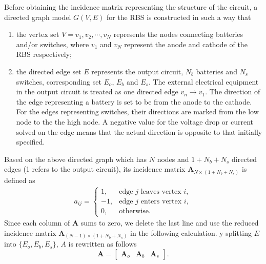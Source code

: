 \documentclass{article}
\begin{document}
Before obtaining the incidence matrix representing the structure of the circuit, a directed graph model $G(V,E)$ for the RBS is constructed in such a way that
\begin{enumerate}[(1)]
    \item the vertex set $V={v_1,v_2,\cdots,v_N}$ represents the nodes connecting batteries and/or switches, where $v_1$ and $v_N$ represent the anode and cathode of the RBS respectively;
    \item the directed edge set $E$ represents the output circuit, $N_b$ batteries and $N_s$ switches, corresponding set $E_o$, $E_b$ and $E_s$. The external electrical equipment in the output circuit is treated as one directed edge $v_n \to v_1$. The direction of the edge representing a battery is set to be from the anode to the cathode. For the edges representing switches, their directions are marked from the low node to the the high node. A negative value for the voltage drop or current solved on the edge means that the actual direction is opposite to that initially specified.
\end{enumerate}


Based on the above directed graph which has $N$ nodes and $1+N_b+N_s$ directed edges (1 refers to the output circuit), its incidence matrix $\bm{A}_{N\times (1+N_b+N_s)}$ is defined as
\begin{align}\label{eq:A}
    a_{ij}=
    \begin{cases}
        1,  & \text{edge  $j$ leaves vertex $i$},\\
        -1, & \text{edge $j$ enters vertex $i$},\\
        0,  & \text{otherwise}.
    \end{cases}
\end{align}
Since each column of $\bm{A}$ sums to zero, we delete the last line and use the reduced incidence matrix $\bm{A}_{(N-1)\times(1+N_b+N_s)}$ in the following calculation.
y splitting $E$ into $\{E_o, E_b, E_s\}$, $A$ is rewritten as follows
\begin{equation}
    \bm{A} = 
    \begin{bmatrix}
        \bm{A}_o & \bm{A}_b & \bm{A}_s
    \end{bmatrix}.
\end{equation}
\end{document}
